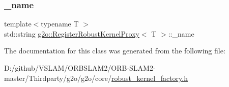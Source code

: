 \subsubsection{\texorpdfstring{\+\_\+name}{\_name}}
{\footnotesize\ttfamily template$<$typename T $>$ \\
std\+::string \mbox{\hyperlink{classg2o_1_1_register_robust_kernel_proxy}{g2o\+::\+Register\+Robust\+Kernel\+Proxy}}$<$ T $>$\+::\+\_\+name\hspace{0.3cm}{\ttfamily [private]}}



The documentation for this class was generated from the following file\+:\begin{DoxyCompactItemize}
\item 
D\+:/github/\+V\+S\+L\+A\+M/\+O\+R\+B\+S\+L\+A\+M2/\+O\+R\+B-\/\+S\+L\+A\+M2-\/master/\+Thirdparty/g2o/g2o/core/\mbox{\hyperlink{robust__kernel__factory_8h}{robust\+\_\+kernel\+\_\+factory.\+h}}\end{DoxyCompactItemize}
